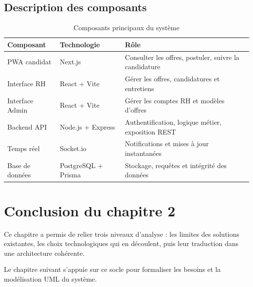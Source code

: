 \subsection{Description des composants}

\begin{table}[H]
\centering
\caption{Composants principaux du système}
\begin{tabularx}{\textwidth}{|l|l|X|}
\hline
\textbf{Composant} & \textbf{Technologie} & \textbf{Rôle} \\
\hline
PWA candidat & Next.js & Consulter les offres, postuler, suivre la candidature \\
\hline
Interface RH & React + Vite & Gérer les offres, candidatures et entretiens \\
\hline
Interface Admin & React + Vite & Gérer les comptes RH et modèles d'offres \\
\hline
Backend API & Node.js + Express & Authentification, logique métier, exposition REST \\
\hline
Temps réel & Socket.io & Notifications et mises à jour instantanées \\
\hline
Base de données & PostgreSQL + Prisma & Stockage, requêtes et intégrité des données \\
\hline
\end{tabularx}
\end{table}

\section*{Conclusion du chapitre 2}

Ce chapitre a permis de relier trois niveaux d'analyse : les limites des
solutions existantes, les choix technologiques qui en découlent, puis leur
traduction dans une architecture cohérente.

Le chapitre suivant s'appuie sur ce socle pour formaliser les besoins et
la modélisation UML du système.
